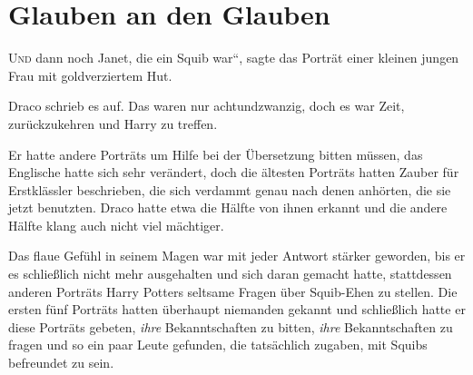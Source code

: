 \chapter{Glauben an den Glauben}


\lettrine[ante=„]{U}{nd} dann noch Janet, die ein Squib war“, sagte das Porträt einer kleinen jungen Frau mit goldverziertem Hut.

Draco schrieb es auf. Das waren nur achtundzwanzig, doch es war Zeit, zurückzukehren und Harry zu treffen.

Er hatte andere Porträts um Hilfe bei der Übersetzung bitten müssen, das Englische hatte sich sehr verändert, doch die ältesten Porträts hatten Zauber für Erstklässler beschrieben, die sich verdammt genau nach denen anhörten, die sie jetzt benutzten. Draco hatte etwa die Hälfte von ihnen erkannt und die andere Hälfte klang auch nicht viel mächtiger.

Das flaue Gefühl in seinem Magen war mit jeder Antwort stärker geworden, bis er es schließlich nicht mehr ausgehalten und sich daran gemacht hatte, stattdessen anderen Porträts Harry Potters seltsame Fragen über Squib-Ehen zu stellen. Die ersten fünf Porträts hatten überhaupt niemanden gekannt und schließlich hatte er diese Porträts gebeten, \emph{ihre} Bekanntschaften zu bitten, \emph{ihre} Bekanntschaften zu fragen und so ein paar Leute gefunden, die tatsächlich zugaben, mit Squibs befreundet zu sein.

